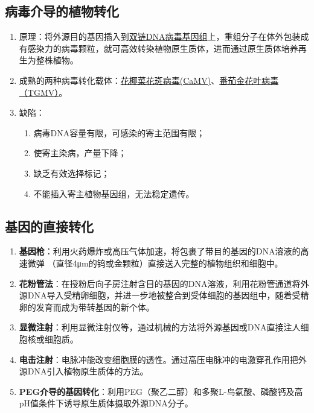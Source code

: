 \subsection{病毒介导的植物转化}
\begin{enumerate}
    \item 原理：将外源目的基因插入到\uline{双链DNA病毒基因组}上，重组分子在体外包装成有感染力的病毒颗粒，就可高效转染植物原生质体，进而通过原生质体培养再生为整株植物。
    \item 成熟的两种病毒转化载体：\uline{花椰菜花斑病毒(CaMV)}、\uline{番茄金花叶病毒（TGMV）}。
    \item 缺陷：
    \begin{enumerate}
        \item 病毒DNA容量有限，可感染的寄主范围有限；
        \item 使寄主染病，产量下降；
        \item 缺乏有效选择标记；
        \item 不能插入寄主植物基因组，无法稳定遗传。
    \end{enumerate}
\end{enumerate}
\subsection{基因的直接转化}
\begin{enumerate}
    \item \textbf{基因枪}：利用火药爆炸或高压气体加速，将包裹了带目的基因的DNA溶液的高速微弹 （直径4μm的钨或金颗粒）直接送入完整的植物组织和细胞中。
    \item \textbf{花粉管法}：在授粉后向子房注射含目的基因的DNA溶液，利用花粉管通道将外源DNA导入受精卵细胞，并进一步地被整合到受体细胞的基因组中，随着受精卵的发育而成为带转基因的新个体。
    \item \textbf{显微注射}：利用显微注射仪等，通过机械的方法将外源基因或DNA直接注人细胞核或细胞质。
    \item \textbf{电击注射}：电脉冲能改变细胞膜的透性。通过高压电脉冲的电激穿孔作用把外源DNA引入植物原生质体的方法。
    \item \textbf{PEG介导的基因转化}：利用PEG（聚乙二醇）和多聚L-鸟氨酸、磷酸钙及高pH值条件下诱导原生质体摄取外源DNA分子。
\end{enumerate}
